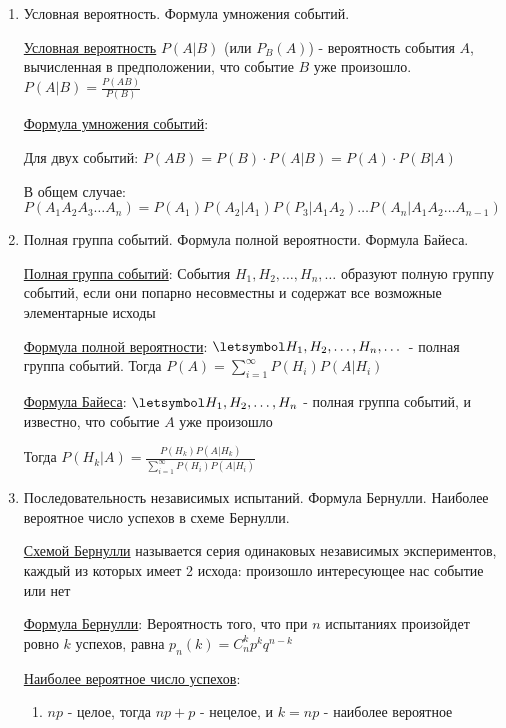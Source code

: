 \begin{enumerate}
    \item Условная вероятность. Формула умножения событий.

    \hyperlink{conditionalprobability}{Условная вероятность} $P(A|B)$ (или $P_B(A)$) - вероятность события $A$, вычисленная в предположении, что событие $B$ уже произошло. $P(A|B) = \frac{P(AB)}{P(B)}$

    \hyperlink{eventsmultiplicationformula}{Формула умножения событий}:

    Для двух событий: $P(AB) = P(B) \cdot P(A|B) = P(A) \cdot P(B|A)$

    В общем случае: $P(A_1 A_2 A_3 \dots A_n) = P(A_1) P(A_2 | A_1) P(P_3 | A_1 A_2) \dots P(A_n | A_1 A_2 \dots A_{n - 1})$

    \item Полная группа событий. Формула полной вероятности. Формула Байеса.

    \hyperlink{completegroupofevents}{Полная группа событий}: События $H_1, H_2, \dots, H_n, \dots$ образуют полную группу событий, если они попарно несовместны и содержат все возможные элементарные исходы

    \hyperlink{formulaofcompleteprobability}{Формула полной вероятности}: $\letsymbol H_1, H_2, \dots, H_n, \dots$ - полная группа событий. Тогда $P(A) = \sum_{i = 1}^\infty P(H_i) P(A | H_i)$
    
    \hyperlink{bayesformula}{Формула Байеса}: $\letsymbol H_1, H_2, \dots, H_n$ - полная группа событий, и известно, что событие $A$ уже произошло

    Тогда $P(H_k | A) = \frac{P(H_k) P(A | H_k)}{\sum_{i = 1}^\infty P(H_i) P(A | H_i)}$

    \item Последовательность независимых испытаний. Формула Бернулли. Наиболее вероятное число успехов в схеме Бернулли.

    \hyperlink{bernoullischema}{Схемой Бернулли} называется серия одинаковых независимых экспериментов, каждый из которых имеет 2 исхода: произошло интересующее нас событие или нет

    \hyperlink{bernoulliformula}{Формула Бернулли}: Вероятность того, что при $n$ испытаниях произойдет ровно $k$ успехов, равна
    $p_n(k) = C_n^k p^k q^{n - k}$

    \hyperlink{themostprobablenumberofsuccesses}{Наиболее вероятное число успехов}: 

    \begin{enumerate}
        \item $np$ - целое, тогда $np + p$ - нецелое, и $k = np$ - наиболее вероятное


\end{enumerate}
\end{enumerate}
